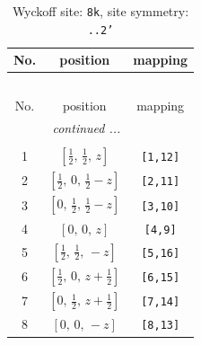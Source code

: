 \documentclass[fleqn,8pt]{jsarticle}
\begin{document}
\begin{longtable}{ccc}
\caption{Wyckoff site: {\tt 8k}, site symmetry: {\tt ..2'}}
 \\
 \hline \hline
No. & position & mapping \\ \hline \endfirsthead

\multicolumn{2}{l}{\tablename\ \thetable{}} \\
 \hline \hline
No. & position & mapping \\ \hline \endhead

 \hline \hline
\multicolumn{2}{r}{\footnotesize\it continued ...} \\ \endfoot

 \hline \hline
\multicolumn{2}{r}{} \\ \endlastfoot

1 & $\left[ \frac{1}{2},\, \frac{1}{2},\, z \right]$ & {\tt [1,12]} \\ \hline
2 & $\left[ \frac{1}{2},\, 0,\, \frac{1}{2} - z \right]$ & {\tt [2,11]} \\ \hline
3 & $\left[ 0,\, \frac{1}{2},\, \frac{1}{2} - z \right]$ & {\tt [3,10]} \\ \hline
4 & $\left[ 0,\, 0,\, z \right]$ & {\tt [4,9]} \\ \hline
5 & $\left[ \frac{1}{2},\, \frac{1}{2},\, - z \right]$ & {\tt [5,16]} \\ \hline
6 & $\left[ \frac{1}{2},\, 0,\, z + \frac{1}{2} \right]$ & {\tt [6,15]} \\ \hline
7 & $\left[ 0,\, \frac{1}{2},\, z + \frac{1}{2} \right]$ & {\tt [7,14]} \\ \hline
8 & $\left[ 0,\, 0,\, - z \right]$ & {\tt [8,13]} \\
\end{longtable}
\renewcommand{\arraystretch}{1.2}
\end{document}

